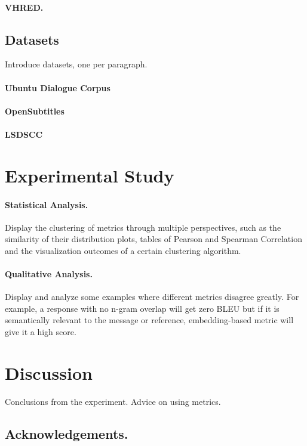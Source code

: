 \documentclass[runningheads]{llncs}
\begin{document}
    \paragraph{VHRED.}

    \subsection{Datasets}
    Introduce datasets, one per paragraph.
    \paragraph{Ubuntu Dialogue Corpus}
    \paragraph{OpenSubtitles}
    \paragraph{LSDSCC}


    \section{Experimental Study}
    \paragraph{Statistical Analysis.}
    Display the clustering of metrics through multiple perspectives,
    such as the similarity of their distribution plots, tables of Pearson and Spearman Correlation
    and the visualization outcomes of a certain clustering algorithm.

    \paragraph{Qualitative Analysis.}
    Display and analyze some examples where different metrics disagree greatly.
    For example, a response with no n-gram overlap will get zero BLEU but if it is semantically
    relevant to the message or reference, embedding-based metric will give it a high score.

    \section{Discussion}
    Conclusions from the experiment.
    Advice on using metrics.

    \subsection*{Acknowledgements.}

    
    
\end{document}
